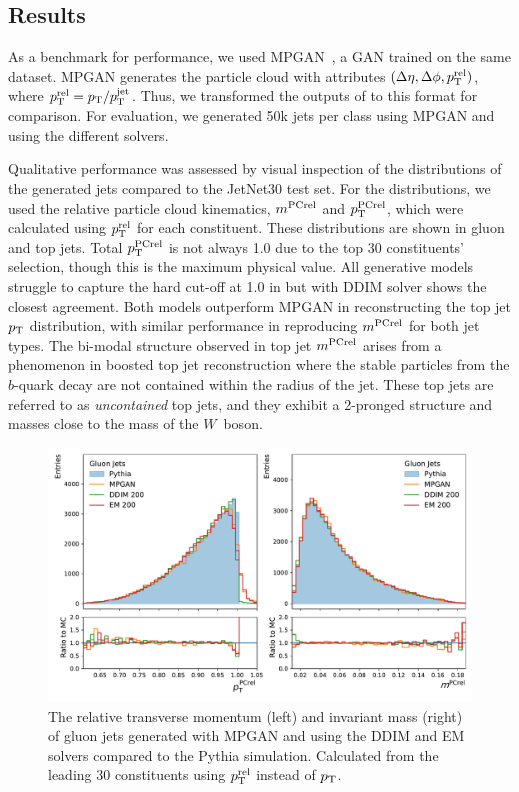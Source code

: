 \subsection{Results}

As a benchmark for performance, we used MPGAN~\cite{MPGAN}, a GAN trained on the same dataset.
MPGAN generates the particle cloud with attributes $(\Delta\eta, \Delta\phi, p_\mathrm{T}^\text{rel})$, where $p_\mathrm{T}^\text{rel} = p_\mathrm{T} / p_\mathrm{T}^{\text{jet}}$.
Thus, we transformed the outputs of \pcjedi to this format for comparison.
For evaluation, we generated 50k jets per class using MPGAN and \pcjedi using the different solvers.

Qualitative performance was assessed by visual inspection of the distributions of the generated jets compared to the JetNet30 test set.
For the distributions, we used the relative particle cloud kinematics, $m^{\text{PCrel}}$ and $p_\mathrm{T}^{\text{PCrel}}$, which were calculated using $p_\mathrm{T}^\text{rel}$ for each constituent.
These distributions are shown in  gluon and top jets.
Total $p_\mathrm{T}^{\text{PCrel}}$ is not always 1.0 due to the top 30 constituents' selection, though this is the maximum physical value.
All generative models struggle to capture the hard cut-off at 1.0 in but \pcjedi with DDIM solver shows the closest agreement.
Both \pcjedi models outperform MPGAN in reconstructing the top jet $p_\mathrm{T}$ distribution, with similar performance in reproducing $m^{\text{PCrel}}$ for both jet types.
The bi-modal structure observed in top jet $m^{\text{PCrel}}$ arises from a phenomenon in boosted top jet reconstruction where the stable particles from the $b$-quark decay are not contained within the radius of the jet.
These top jets are referred to as \emph{uncontained} top jets, and they exhibit a 2-pronged structure and masses close to the mass of the $W$~boson.

\begin{figure}[hbpt]
    \centering
    \includegraphics[width=.75\linewidth]{Figures/jet_generation/jedi/gluon/jet_features_rel.pdf}
    \caption{The relative transverse momentum (left) and invariant mass (right) of gluon jets generated with MPGAN and \pcjedi using the DDIM and EM solvers compared to the Pythia simulation. Calculated from the leading 30 \pt constituents using $p_\mathrm{T}^\text{rel}$ instead of $p_\mathrm{T}$.}
    \label{fig:kinematics_gluon}
\end{figure}

